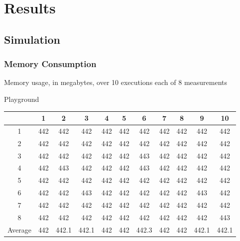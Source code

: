 \section{Results}

\subsection{Simulation}
\subsubsection{Memory Consumption}
\begin{center}
    Memory usage, in megabytes, over 10 executions each of 8 measurements

    Playground\\
    \begin{tabular}{ |c|c|c|c|c|c|c|c|c|c|c| }
        \hline
          & 1 & 2 & 3 & 4 & 5 & 6 & 7 & 8 & 9 & 10 \\
        \hline
        \hline
        1 & 442 & 442 & 442 & 442 & 442 & 442 & 442 & 442 & 442 & 442 \\
        2 & 442 & 442 & 442 & 442 & 442 & 442 & 442 & 442 & 442 & 442 \\
        3 & 442 & 442 & 442 & 442 & 442 & 443 & 442 & 442 & 442 & 442 \\
        4 & 442 & 443 & 442 & 442 & 442 & 443 & 442 & 442 & 442 & 442 \\
        5 & 442 & 442 & 442 & 442 & 442 & 442 & 442 & 442 & 442 & 442 \\
        6 & 442 & 442 & 443 & 442 & 442 & 442 & 442 & 442 & 443 & 442 \\
        7 & 442 & 442 & 442 & 442 & 442 & 442 & 442 & 442 & 442 & 442 \\
        8 & 442 & 442 & 442 & 442 & 442 & 442 & 442 & 442 & 442 & 443 \\
        \hline
        \hline
        Average & 442 & 442.1 & 442.1 & 442 & 442 & 442.3 & 442 & 442 & 442.1 & 442.1 \\
        \hline
    \end{tabular}


\end{center}
